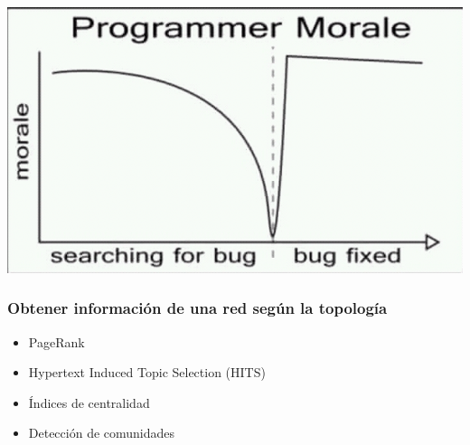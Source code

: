 \documentclass[
10pt, %
aspectratio=169, %
]{beamer}
\begin{document}
	{
		{%
			\includegraphics[width=\paperwidth,height=\paperheight]{break1.png}
		}
		
		\begin{frame}
		\end{frame}
	}
	
	\begin{frame}
		
		\frametitle{Obtener información de una red según la topología}
		
		\begin{itemize}
			\item PageRank \\[2mm]
			
			\item Hypertext Induced Topic Selection (HITS) \\[2mm]
			
			\item Índices de centralidad \\[2mm]
			
			\item Detección de comunidades
			
		\end{itemize}
		
	\end{frame}
	
\end{document}
